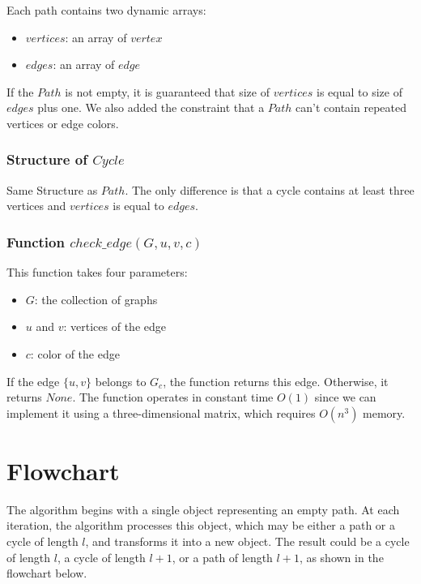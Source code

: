 Each path contains two dynamic arrays:

\begin{itemize}
    \item $vertices$: an array of $vertex$
    \item $edges$: an array of $edge$
\end{itemize}

If the $Path$ is not empty, it is guaranteed that size of 
$vertices$ is equal to size of $edges$ plus one. We 
also added the constraint that a $Path$ can't contain repeated 
vertices or edge colors.

\subsubsection{Structure of $Cycle$}

Same Structure as $Path$. The only difference is that a cycle contains
at least three vertices and $vertices$ is equal to $edges$.

\subsubsection{Function $check\_edge(G, u, v, c)$}

This function takes four parameters:

\begin{itemize}
    \item $G$: the collection of graphs
    \item $u$ and $v$: vertices of the edge
    \item $c$: color of the edge
\end{itemize}

If the edge $\{u, v\}$ belongs to $G_c$, the function returns this edge. Otherwise, it returns $None$. The function operates in constant time $O(1)$ since we can implement it using a three-dimensional matrix, which requires $O(n^3)$ memory.

\section{Flowchart}

The algorithm begins with a single object representing an empty path. At 
each iteration, the algorithm processes this object, which may be either 
a path or a cycle of length $l$, and transforms it into a new object. 
The result could be a cycle of length $l$, a cycle of length $l+1$, or 
a path of length $l+1$, as shown in the flowchart below.

